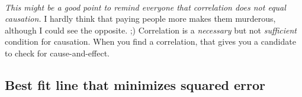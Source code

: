 \begin{fullwidth}
\\

{\em This might be a good point to remind everyone that correlation does not equal causation.}  I hardly think that paying people more makes them murderous, although I could see the opposite. ;)  Correlation is a {\em necessary} but not {\em sufficient} condition for causation. When you find a correlation, that gives you a candidate to check for cause-and-effect.

\subsection{Best fit line that minimizes squared error}


\end{fullwidth}
